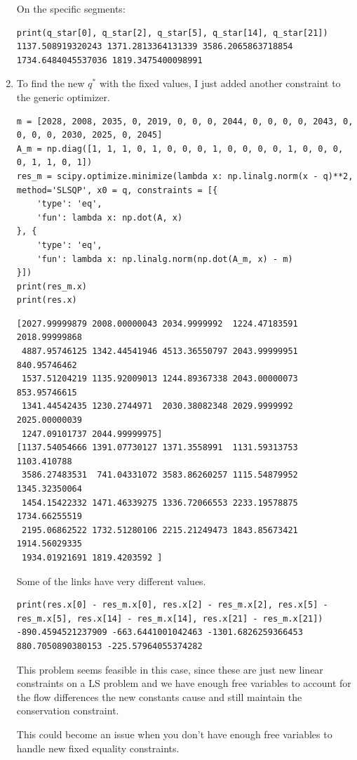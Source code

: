 \documentclass[11pt]{article}
\begin{document}
\begin{solution}
\begin{enumerate}
On the specific segments:
\begin{verbatim}
print(q_star[0], q_star[2], q_star[5], q_star[14], q_star[21])
1137.508919320243 1371.2813364131339 3586.2065863718854 1734.6484045537036 1819.3475400098991
\end{verbatim}

\item To find the new $q^*$ with the fixed values, I just added another constraint to the generic optimizer.
\begin{verbatim}
m = [2028, 2008, 2035, 0, 2019, 0, 0, 0, 2044, 0, 0, 0, 0, 2043, 0, 0, 0, 0, 2030, 2025, 0, 2045]
A_m = np.diag([1, 1, 1, 0, 1, 0, 0, 0, 1, 0, 0, 0, 0, 1, 0, 0, 0, 0, 1, 1, 0, 1])
res_m = scipy.optimize.minimize(lambda x: np.linalg.norm(x - q)**2, method='SLSQP', x0 = q, constraints = [{
    'type': 'eq',
    'fun': lambda x: np.dot(A, x)
}, {
    'type': 'eq',
    'fun': lambda x: np.linalg.norm(np.dot(A_m, x) - m)
}])
print(res_m.x)
print(res.x)
\end{verbatim}
\begin{verbatim}
[2027.99999879 2008.00000043 2034.9999992  1224.47183591 2018.99999868
 4887.95746125 1342.44541946 4513.36550797 2043.99999951  840.95746462
 1537.51204219 1135.92009013 1244.89367338 2043.00000073  853.95746615
 1341.44542435 1230.2744971  2030.38082348 2029.9999992  2025.00000039
 1247.09101737 2044.99999975]
[1137.54054666 1391.07730127 1371.3558991  1131.59313753 1103.410788
 3586.27483531  741.04331072 3583.86260257 1115.54879952 1345.32350064
 1454.15422332 1471.46339275 1336.72066553 2233.19578875 1734.66255519
 2195.06862522 1732.51280106 2215.21249473 1843.85673421 1914.56029335
 1934.01921691 1819.4203592 ]
\end{verbatim}

Some of the links have very different values.
\begin{verbatim}
print(res.x[0] - res_m.x[0], res.x[2] - res_m.x[2], res.x[5] - res_m.x[5], res.x[14] - res_m.x[14], res.x[21] - res_m.x[21])
-890.4594521237909 -663.6441001042463 -1301.6826259366453 880.7050890380153 -225.57964055374282
\end{verbatim}

This problem seems feasible in this case, since these are just new linear constraints on a LS problem and we have enough free variables to account for the flow differences the new constants cause and still maintain the conservation constraint.

This could become an issue when you don't have enough free variables to handle new fixed equality constraints.
\end{enumerate}
\end{solution}
\end{document}

